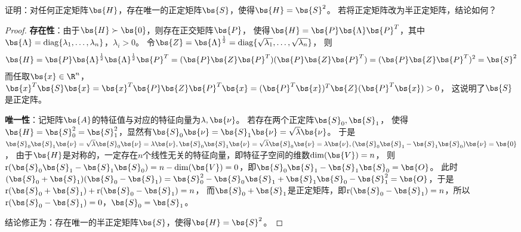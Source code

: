 \documentclass[12pt, a4paper, oneside, UTF8]{ctexbook}
\begin{document}
   


\begin{question}
    证明：对任何正定矩阵$\bs{H}$，存在唯一的正定矩阵$\bs{S}$，使得$\bs{H}=\bs{S}^2$。
    若将正定矩阵改为半正定矩阵，结论如何？
\end{question}

\begin{proof}
    \textbf{存在性}：由于$\bs{H} \succ \bs{0}$，则存在正交矩阵$\bs{P}$，
    使得$\bs{H}=\bs{P}\bs{\Lambda}\bs{P}^T$，其中$\bs{\Lambda}
    =\mathrm{diag}\{\lambda_1,\ldots,\lambda_n\}$，$\lambda_i > 0$。
    令$\bs{Z}=\bs{\Lambda}^{\frac{1}{2}}=\mathrm{diag}\{\sqrt{\lambda_1},\ldots,\sqrt{\lambda_n}\}$，
    则
    \begin{align*}
        \bs{H}=\bs{P}\bs{\Lambda}^{\frac{1}{2}}\bs{\Lambda}^{\frac{1}{2}}\bs{P}^T=(\bs{P}\bs{Z}\bs{P}^T)(\bs{P}\bs{Z}\bs{P}^T)
        =(\bs{P}\bs{Z}\bs{P}^T)^2=\bs{S}^2
    \end{align*}
    而任取$\bs{x}\in \R^n$，$\bs{x}^T\bs{S}\bs{x}=
    \bs{x}^T\bs{P}\bs{Z}\bs{P}^T\bs{x}=
    (\bs{P}^T\bs{x})^T\bs{Z}(\bs{P}^T\bs{x}) >0$，
    这说明了$\bs{S}$是正定阵。

    \textbf{唯一性}：记矩阵$\bs{A}$的特征值与对应的特征向量为$\lambda,\bs{\nu}$。
    若存在两个正定阵$\bs{S}_0,\bs{S}_1$，
    使得$\bs{H}=\bs{S}_0^2=\bs{S}_1^2$，显然有$\bs{S}_0\bs{\nu}=\bs{S}_1\bs{\nu}=\sqrt{\lambda}\bs{\nu}$。
    于是$\bs{S}_0\bs{S}_1\bs{\nu}=\sqrt{\lambda}\bs{S}_0\bs{\nu}=\lambda \bs{\nu},
    \bs{S}_0\bs{S}_1\bs{\nu}=\sqrt{\lambda}\bs{S}_0\bs{\nu}=\lambda \bs{\nu},
    (\bs{S}_0\bs{S}_1-\bs{S}_1\bs{S}_0)\bs{\nu}=\bs{0}$，
    由于$\bs{H}$是对称的，一定存在$n$个线性无关的特征向量，即特征子空间的维数$\mathrm{dim}(\bs{V})=n$，
    则$\mathrm{r}(\bs{S}_0\bs{S}_1-\bs{S}_1\bs{S}_0)=n-\mathrm{dim}(\bs{V})=0$，即$\bs{S}_0\bs{S}_1-\bs{S}_1\bs{S}_0=\bs{O}$。
    此时$(\bs{S}_0+\bs{S}_1)(\bs{S}_0-\bs{S}_1)=\bs{S}_0^2-\bs{S}_0\bs{S}_1+\bs{S}_1\bs{S}_0-\bs{S}_1^2=\bs{O}$，于是$\mathrm{r}(\bs{S}_0+\bs{S}_1)+\mathrm{r}(\bs{S}_0-\bs{S}_1)=n$，
    而$\bs{S}_0+\bs{S}_1$是正定矩阵，即$\mathrm{r}(\bs{S}_0-\bs{S}_1)=n$，所以$\mathrm{r}(\bs{S}_0-\bs{S}_1)=0$，$\bs{S}_0=\bs{S}_1$。
    
    结论修正为：存在唯一的半正定矩阵$\bs{S}$，使得$\bs{H}=\bs{S}^2$。
    
\end{proof}







\ifx\allfiles\undefined
\end{document}

